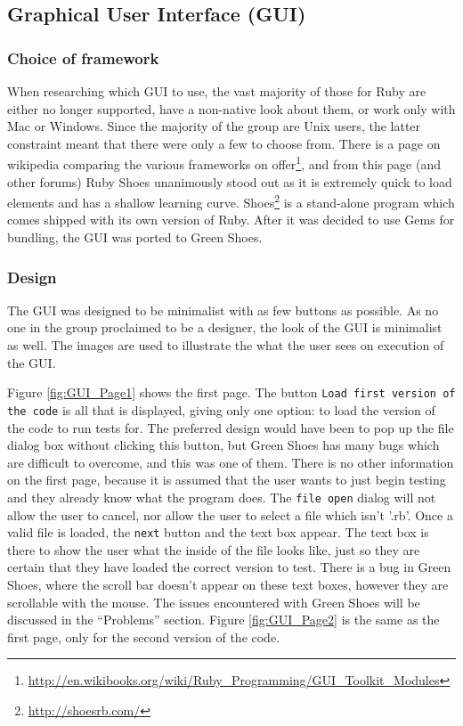  \subsection{Graphical User Interface (GUI)}
  \subsubsection{Choice of framework}
  When researching which GUI to use, the vast majority of those for Ruby are either no longer supported, have a non-native look about them, or work only with Mac or Windows. Since the majority of the group are Unix users, the latter constraint meant that there were only a few to choose from. There is a page on wikipedia comparing the various frameworks on offer\footnote{\url{http://en.wikibooks.org/wiki/Ruby_Programming/GUI_Toolkit_Modules}}, and from this page (and other forums) Ruby Shoes unanimously stood out as it is extremely quick to load elements and has a shallow learning curve.
  Shoes\footnote{\url{http://shoesrb.com/}} is a stand-alone program which comes shipped with its own version of Ruby. After it was decided to use Gems for bundling, the GUI was ported to Green Shoes.
  
  \subsubsection{Design}
  The GUI was designed to be minimalist with as few buttons as possible. As no one in the group proclaimed to be a designer, the look of the GUI is minimalist as well. The images are used to illustrate the what the user sees on execution of the GUI.
  
  Figure \ref{fig:GUI_Page1} shows the first page. The button \verb+Load first version of the code+ is all that is displayed, giving only one option: to load the version of the code to run tests for. The preferred design would have been to pop up the file dialog box without clicking this button, but Green Shoes has many bugs which are difficult to overcome, and this was one of them. There is no other information on the first page, because it is assumed that the user wants to just begin testing and they already know what the program does. The \verb+file open+ dialog will not allow the user to cancel, nor allow the user to select a file which isn't '.rb'. Once a valid file is loaded, the \verb+next+ button and the text box appear. The text box is there to show the user what the inside of the file looks like, just so they are certain that they have loaded the correct version to test. There is a bug in Green Shoes, where the scroll bar doesn't appear on these text boxes, however they are scrollable with the mouse. The issues encountered with Green Shoes will be discussed in the ``Problems'' section. Figure \ref{fig:GUI_Page2} is the same as the first page, only for the second version of the code.
  
